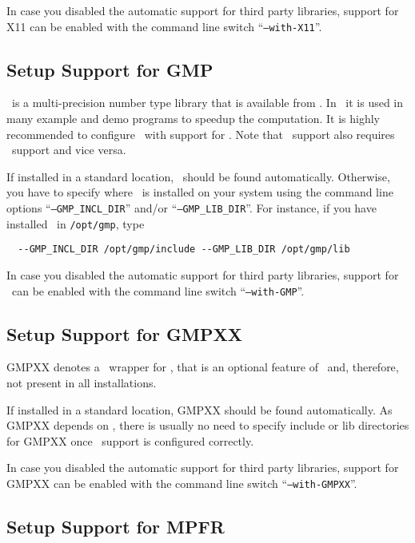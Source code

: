 In case you disabled the automatic support for third party libraries,
support for X11 can be enabled with the command line switch
``\texttt{--with-X11}''.

\subsection{Setup Support for GMP\label{sec:gmp-setup}}

\gmp\ is a multi-precision number type library that is available from
\gmppage. In \cgal\ it is used in many example and demo programs to
speedup the computation. It is highly recommended to configure \cgal\
with support for \gmp. Note that \gmp\ support also requires \mpfr\
support and vice versa.

If installed in a standard location, \gmp\ should be
found automatically. Otherwise, you have to specify where \gmp\ is
installed on your system using the command line options
``\texttt{--GMP\_INCL\_DIR}'' and/or ``\texttt{--GMP\_LIB\_DIR}''. For
instance, if you have installed \gmp\ in \texttt{/opt/gmp}, type
\begin{verbatim}
  --GMP_INCL_DIR /opt/gmp/include --GMP_LIB_DIR /opt/gmp/lib
\end{verbatim}

In case you disabled the automatic support for third party libraries,
support for \gmp\ can be enabled with the command line switch
``\texttt{--with-GMP}''.

\subsection{Setup Support for GMPXX\label{sec:gmpxx-setup}}

GMPXX denotes a \CC\ wrapper for \gmp, that is an optional feature of
\gmp\ and, therefore, not present in all installations.

If installed in a standard location, GMPXX should be found
automatically. As GMPXX depends on \gmp, there is usually no need to
specify include or lib directories for GMPXX once \gmp\ support is
configured correctly.

In case you disabled the automatic support for third party libraries,
support for GMPXX can be enabled with the command line switch
``\texttt{--with-GMPXX}''.

\subsection{Setup Support for MPFR\label{sec:mpfr-setup}}

